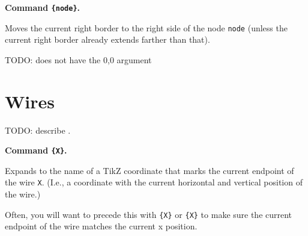 \documentclass[a4paper]{article}
\makeatletter
\newenvironment{command}[2]{%
  \medskip\noindent\textbf{Command \macroanchor#1\texttt{#2}.} 
}{%
}
\newcommand\nobsstring[1]{{\escapechar=-1\xdef\@tempa{\string#1}}}
\DeclareRobustCommand\macrolink[1]{\nobsstring#1\hyperref[command-\@tempa]{\texttt{\string#1}}}
\DeclareRobustCommand\macroanchor[1]{\nobsstring#1\label{command-\@tempa}\texttt{\string#1}}
\makeatother
\begin{document}
\begin{command}\registerRightBorderCandidate{\{node\}}
  Moves the current right border to the right side of the node
  \texttt{node} (unless the current right border already extends
  farther than that).

\begin{example}
\end{example}
\end{command}


TODO: \macrolink\newWire does not have the {0,0} argument

\section{Wires}
\label{sec:wires}

TODO: describe \macrolink\newWire.

\begin{command}\getWireCoord{\{X\}}
  Expands to the name of a TikZ coordinate that marks the current
  endpoint of the wire \texttt{X}. (I.e., a coordinate with the
  current horizontal and vertical position of the wire.)

  Often, you will want to precede this with
  \macrolink{\drawWires}\texttt{\{X\}} or
  \macrolink{\skipWires}\texttt{\{X\}} to make sure the current
  endpoint of the wire matches the current x position.

\begin{example}
\end{example}
\end{command}
\end{document}
